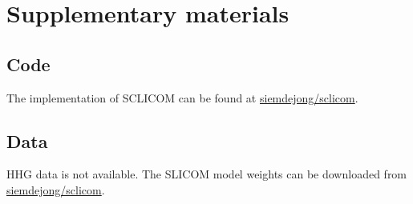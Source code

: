 \section{Supplementary materials}
\subsection{Code}
The implementation of SCLICOM can be found at \href{https://github.io/siemdejong/sclicom}{ siemdejong/sclicom}.

\subsection{Data}
HHG data is not available.
The SLICOM model weights can be downloaded from \href{https://github.io/siemdejong/sclicom}{ siemdejong/sclicom}.
